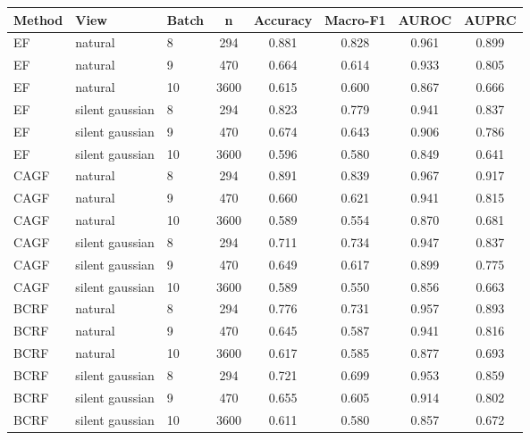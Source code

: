 \begin{tabular}{lllccccc}
\toprule
Method & View & Batch & n & Accuracy & Macro-F1 & AUROC & AUPRC \\
\midrule
EF & natural & 8 & 294 & 0.881 & 0.828 & 0.961 & 0.899 \\
EF & natural & 9 & 470 & 0.664 & 0.614 & 0.933 & 0.805 \\
EF & natural & 10 & 3600 & 0.615 & 0.600 & 0.867 & 0.666 \\
EF & silent gaussian & 8 & 294 & 0.823 & 0.779 & 0.941 & 0.837 \\
EF & silent gaussian & 9 & 470 & 0.674 & 0.643 & 0.906 & 0.786 \\
EF & silent gaussian & 10 & 3600 & 0.596 & 0.580 & 0.849 & 0.641 \\
CAGF & natural & 8 & 294 & 0.891 & 0.839 & 0.967 & 0.917 \\
CAGF & natural & 9 & 470 & 0.660 & 0.621 & 0.941 & 0.815 \\
CAGF & natural & 10 & 3600 & 0.589 & 0.554 & 0.870 & 0.681 \\
CAGF & silent gaussian & 8 & 294 & 0.711 & 0.734 & 0.947 & 0.837 \\
CAGF & silent gaussian & 9 & 470 & 0.649 & 0.617 & 0.899 & 0.775 \\
CAGF & silent gaussian & 10 & 3600 & 0.589 & 0.550 & 0.856 & 0.663 \\
BCRF & natural & 8 & 294 & 0.776 & 0.731 & 0.957 & 0.893 \\
BCRF & natural & 9 & 470 & 0.645 & 0.587 & 0.941 & 0.816 \\
BCRF & natural & 10 & 3600 & 0.617 & 0.585 & 0.877 & 0.693 \\
BCRF & silent gaussian & 8 & 294 & 0.721 & 0.699 & 0.953 & 0.859 \\
BCRF & silent gaussian & 9 & 470 & 0.655 & 0.605 & 0.914 & 0.802 \\
BCRF & silent gaussian & 10 & 3600 & 0.611 & 0.580 & 0.857 & 0.672 \\
\bottomrule
\end{tabular}
